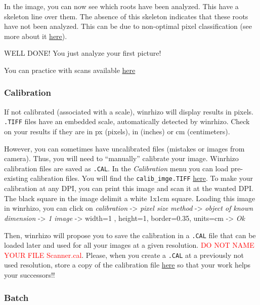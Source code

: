 \documentclass[
  12pt,
  american,
  a4paper,
  extrafontsizes,onecolumn,openright
  ]{memoir}
\begin{document}
In the image, you can now see which roots have been analyzed. This have a skeleton line over them. The absence of this skeleton indicates that these roots have not been analyzed. This can be due to non-optimal pixel classification (see more about it \protect\hyperlink{pixel-classification}{here}).

WELL DONE! You just analyze your first picture!

You can practice with scans available \protect\hyperlink{resources}{here}

\hypertarget{calibration}{%
\subsubsection{Calibration}\label{calibration}}

If not calibrated (associated with a scale), winrhizo will display results in pixels. \texttt{.TIFF} files have an embedded scale, automatically detected by winrhizo. Check on your results if they are in px (pixels), in (inches) or cm (centimeters).

However, you can sometimes have uncalibrated files (mistakes or images from camera). Thus, you will need to \enquote{manually} calibrate your image. Winrhizo calibration files are saved as \texttt{.CAL}. In the \emph{Calibration} menu you can load pre-existing calibration files. You will find the \texttt{calib\_imge.TIFF} \href{document/trait/rootmorpho/calib_imge.TIF}{here}. To make your calibration at any DPI, you can print this image and scan it at the wanted DPI. The black square in the image delimit a white 1x1cm square. Loading this image in winrhizo, you can click on \emph{calibration} -\textgreater{} \emph{pixel size method} -\textgreater{} \emph{object of known dimension} -\textgreater{} \emph{1 image} -\textgreater{} width=1 , height=1, border=0.35, units=cm -\textgreater{} \emph{Ok}

Then, winrhizo will propose you to save the calibration in a \texttt{.CAL} file that can be loaded later and used for all your images at a given resolution. \textcolor{red}{DO NOT NAME YOUR FILE Scanner.cal}.
Please, when you create a \texttt{.CAL} at a previously not used resolution, store a copy of the calibration file \href{document/software/Winrhizo/}{here} so that your work helps your successors!!

\hypertarget{batch}{%
\subsubsection{Batch}\label{batch}}
\end{document}
